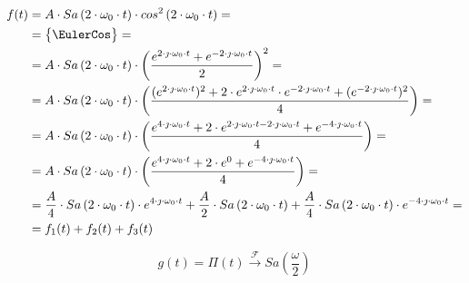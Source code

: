 \begin{task}
\begin{align*}
f(t) &= A \cdot Sa\left(2 \cdot \omega_0 \cdot t\right) \cdot cos^2\left(2 \cdot \omega_0 \cdot t\right)=\\
&=\begin{Bmatrix}
\EulerCos
\end{Bmatrix}=\\
&= A \cdot Sa\left(2 \cdot \omega_0 \cdot t\right) \cdot \left(\frac{e^{2 \cdot \jmath \cdot \omega_0 \cdot t}+e^{-2 \cdot \jmath \cdot \omega_0 \cdot t}}{2}\right)^2=\\
&= A \cdot Sa\left(2 \cdot \omega_0 \cdot t\right) \cdot \left(\frac{(e^{2 \cdot \jmath \cdot \omega_0 \cdot t})^2+ 2 \cdot e^{2 \cdot \jmath \cdot \omega_0 \cdot t} \cdot e^{-2 \cdot \jmath \cdot \omega_0 \cdot t}+(e^{-2 \cdot \jmath \cdot \omega_0 \cdot t})^2}{4}\right)=\\
&= A \cdot Sa\left(2 \cdot \omega_0 \cdot t\right) \cdot \left(\frac{e^{4 \cdot \jmath \cdot \omega_0 \cdot t}+ 2 \cdot e^{2 \cdot \jmath \cdot \omega_0 \cdot t -2 \cdot \jmath \cdot \omega_0 \cdot t}+e^{-4 \cdot \jmath \cdot \omega_0 \cdot t}}{4}\right)=\\
&= A \cdot Sa\left(2 \cdot \omega_0 \cdot t\right) \cdot \left(\frac{e^{4 \cdot \jmath \cdot \omega_0 \cdot t}+ 2 \cdot e^{0}+e^{-4 \cdot \jmath \cdot \omega_0 \cdot t}}{4}\right)=\\
&= \frac{A}{4} \cdot Sa\left(2 \cdot \omega_0 \cdot t\right) \cdot e^{4 \cdot \jmath \cdot \omega_0 \cdot t} + \frac{A}{2} \cdot Sa\left(2 \cdot \omega_0 \cdot t\right) +\frac{A}{4} \cdot Sa\left(2 \cdot \omega_0 \cdot t\right) \cdot e^{-4 \cdot \jmath \cdot \omega_0 \cdot t}=\\
&= f_1(t)+f_2(t)+f_3(t)
\end{align*}




\begin{equation}
g(t) = \Pi(t) \xrightarrow{\mathcal F} Sa\left(\frac{\omega}{2}\right)
\end{equation}


\end{task}
